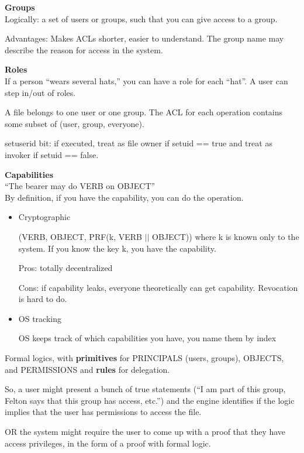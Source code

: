 \textbf{Groups}\\
Logically: a set of users or groups, such that you can give access to a group.

Advantages: Makes ACLs shorter, easier to understand. The group name may describe the reason for access in the system.

\textbf{Roles}\\
If a person ``wears several hats,'' you can have a role for each ``hat''. A user can step in/out of roles.

A file belongs to one user or one group. The ACL for each operation contains some subset of (user, group, everyone).

setuserid bit: if executed, treat as file owner if setuid == true and treat as invoker if setuid == false.

\textbf{Capabilities}\\
``The bearer may do VERB on OBJECT''\\
By definition, if you have the capability, you can do the operation.
\begin{itemize}
    \item Cryptographic

    \begin{example}
    (VERB, OBJECT, PRF(k, VERB $||$ OBJECT)) where k is known only to the system. If you know the key k, you have the capability.
    \end{example}

    Pros: totally decentralized

    Cons: if capability leaks, everyone theoretically can get capability. Revocation is hard to do.

    \item OS tracking

    OS keeps track of which capabilities you have, you name them by index
\end{itemize}

Formal logics, with \textbf{primitives} for PRINCIPALS (users, groups), OBJECTS, and PERMISSIONS and \textbf{rules} for delegation.

So, a user might present a bunch of true statements (``I am part of this group, Felton says that this group has access, etc.'') and the engine identifies if the logic implies that the user has permissions to access the file.

OR the system might require the user to come up with a proof that they have access privileges, in the form of a proof with formal logic.

